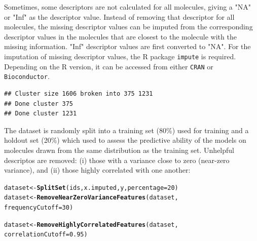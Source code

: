 \documentclass[twoside,a4wide,12pt]{article}\usepackage[]{graphicx}\usepackage[]{color}
\makeatletter
\newcommand{\hlnum}[1]{\textcolor[rgb]{0.686,0.059,0.569}{#1}}%
\newcommand{\hlstd}[1]{\textcolor[rgb]{0.345,0.345,0.345}{#1}}%
\newcommand{\hlkwb}[1]{\textcolor[rgb]{0.69,0.353,0.396}{#1}}%
\newcommand{\hlkwc}[1]{\textcolor[rgb]{0.333,0.667,0.333}{#1}}%
\newcommand{\hlkwd}[1]{\textcolor[rgb]{0.737,0.353,0.396}{\textbf{#1}}}%
\newenvironment{kframe}{%
 \def\at@end@of@kframe{}%
 \ifinner\ifhmode%
  \def\at@end@of@kframe{\end{minipage}}%
  \begin{minipage}{\columnwidth}%
 \fi\fi%
 \def\FrameCommand##1{\hskip\@totalleftmargin \hskip-\fboxsep
 \colorbox{shadecolor}{##1}\hskip-\fboxsep
     \hskip-\linewidth \hskip-\@totalleftmargin \hskip\columnwidth}%
 \MakeFramed {\advance\hsize-\width
   \@totalleftmargin\z@ \linewidth\hsize
   \@setminipage}}%
 {\par\unskip\endMakeFramed%
 \at@end@of@kframe}
\newenvironment{knitrout}{}{} %
\makeatother
\begin{document}
Sometimes, some descriptors are not calculated for all molecules, giving a "NA" or "Inf" as the descriptor value. 
Instead of removing that descriptor for all molecules, the missing descriptor values can be imputed from the corresponding descriptor values in the molecules that are closest to the molecule with the missing information.
"Inf" descriptor values are first converted to "NA".
For the imputation of missing descriptor values, the R package  \texttt{impute} is required.
Depending on the R version, it can be accessed from either \texttt{CRAN} or \texttt{Bioconductor}.
\begin{knitrout}
\color{fgcolor}\begin{kframe}


{\ttfamily\noindent\itshape\color{messagecolor}{\#\# Loading required package: impute}}\begin{verbatim}
## Cluster size 1606 broken into 375 1231 
## Done cluster 375 
## Done cluster 1231
\end{verbatim}
\end{kframe}
\end{knitrout}

The dataset is randomly split into a training set (80\%) used for training and a holdout set (20\%) which used to assess the predictive ability of the models on molecules drawn from the same distribution as the training set. Unhelpful descriptos are removed: (i) those with a variance close to zero (near-zero variance), and (ii) those highly correlated with one another:
\begin{knitrout}
\color{fgcolor}\begin{kframe}
\begin{alltt}
\hlstd{dataset} \hlkwb{<-} \hlkwd{SplitSet}\hlstd{(ids, x.imputed, y,} \hlkwc{percentage} \hlstd{=} \hlnum{20}\hlstd{)}
\hlstd{dataset} \hlkwb{<-} \hlkwd{RemoveNearZeroVarianceFeatures}\hlstd{(dataset,}
    \hlkwc{frequencyCutoff} \hlstd{=} \hlnum{30}\hlstd{)}
\end{alltt}


{\ttfamily\noindent\itshape\color{messagecolor}{\#\# 397 features removed with variance below cutoff}}\begin{alltt}
\hlstd{dataset} \hlkwb{<-} \hlkwd{RemoveHighlyCorrelatedFeatures}\hlstd{(dataset,}
    \hlkwc{correlationCutoff} \hlstd{=} \hlnum{0.95}\hlstd{)}
\end{alltt}


{\ttfamily\noindent\itshape\color{messagecolor}{\#\# 121 features removed with correlation above cutoff}}\end{kframe}
\end{knitrout}
\end{document}
